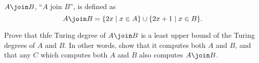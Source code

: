 \begin{problem}
  $A \join B$, ``$A$ join $B$'', is defined as
  \[
    A \join B = \{ 2x \mid x \in A \} \cup \{ 2x+1 \mid x \in B \}.
  \]

  Prove that thfe Turing degree of $A \join B$ is a least upper bound
  of the Turing degrees of $A$ and $B$.
  In other words, show that it computes both $A$ and $B$,
  and that any $C$ which computes both $A$ and $B$
  also computes $A \join B$.

  \begin{answer}
    
  \end{answer}
\end{problem}
